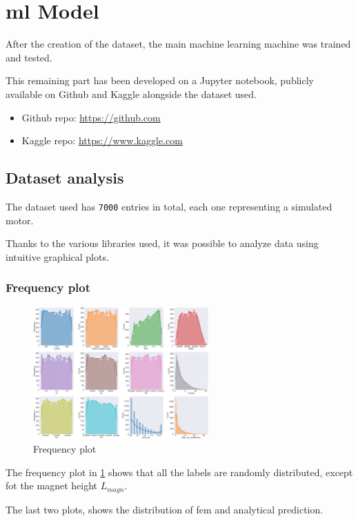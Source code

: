 \section{\texorpdfstring{\gls{ml}}{ML} Model}\label{sec:ML}
After the creation of the dataset, the main machine learning machine was trained and tested.

This remaining part has been developed on a Jupyter notebook, publicly available on Github and Kaggle alongside the dataset used.
\begin{itemize}
    \item Github repo: \url{https://github.com}
    \item Kaggle repo: \url{https://www.kaggle.com}
\end{itemize}
\subsection{Dataset analysis}
The dataset used has \texttt{7000} entries in total, each one representing a simulated motor.

Thanks to the various libraries used, it was possible to analyze data using intuitive graphical plots.
\subsubsection{Frequency plot}
\begin{figure}[H]
    \centering
    \includegraphics[width=0.6\textwidth]{sections/images/section3/frequency_plot.png}
    \caption{Frequency plot}
    \label{fig:freq_plot}
\end{figure}
The frequency plot in \cref{fig:freq_plot} shows that all the labels are randomly distributed, except fot the magnet height $L_{magn}$.

The last two plots, shows the distribution of \gls{fem} and analytical prediction.
